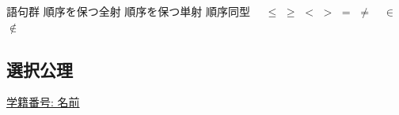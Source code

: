 \documentclass[dvipdfmx,a4paper,11pt]{article}
\theoremstyle{definition}
\begin{document}

 \begin{itembox}[l]{語句群}
 順序を保つ全射 \quad 順序を保つ単射 \quad 順序同型　
 \quad $\le$  \quad $\ge$  \quad $<$  \quad $>$  \quad $=$ \quad $\neq$　\quad $\in$ \quad $\not\in$ 
\end{itembox}

 
 \newpage
 
 \begin{center}
\section{選択公理}
\label{sec-8}
\end{center}

  \begin{flushleft}
{ \large \underline{学籍番号: \hspace{4cm} 名前  \hspace{8.5cm}}}
{\footnotesize }
\end{flushleft}
\end{document}
